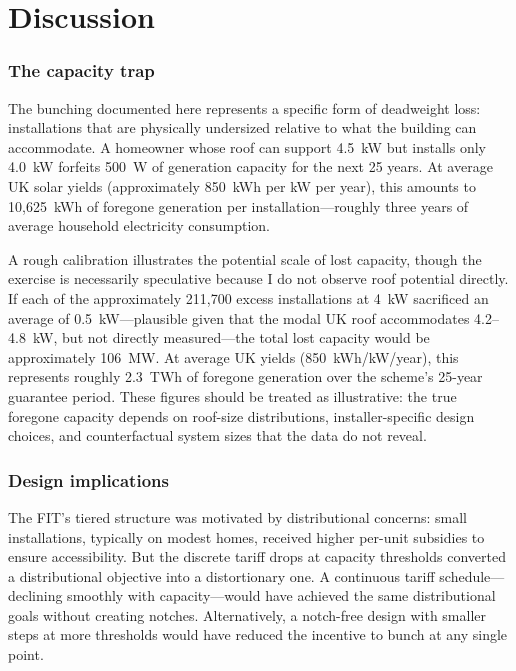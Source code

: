 \documentclass[12pt]{article}
\begin{document}
\section{Discussion}
\label{sec:discussion}

\subsubsection*{The capacity trap} The bunching documented here represents a specific form of deadweight loss: installations that are physically undersized relative to what the building can accommodate. A homeowner whose roof can support 4.5~kW but installs only 4.0~kW forfeits 500~W of generation capacity for the next 25 years. At average UK solar yields (approximately 850~kWh per kW per year), this amounts to 10,625~kWh of foregone generation per installation---roughly three years of average household electricity consumption.

A rough calibration illustrates the potential scale of lost capacity, though the exercise is necessarily speculative because I do not observe roof potential directly. If each of the approximately 211,700 excess installations at 4~kW sacrificed an average of 0.5~kW---plausible given that the modal UK roof accommodates 4.2--4.8~kW, but not directly measured---the total lost capacity would be approximately 106~MW. At average UK yields (850~kWh/kW/year), this represents roughly 2.3~TWh of foregone generation over the scheme's 25-year guarantee period. These figures should be treated as illustrative: the true foregone capacity depends on roof-size distributions, installer-specific design choices, and counterfactual system sizes that the data do not reveal.

\subsubsection*{Design implications} The FIT's tiered structure was motivated by distributional concerns: small installations, typically on modest homes, received higher per-unit subsidies to ensure accessibility. But the discrete tariff drops at capacity thresholds converted a distributional objective into a distortionary one. A continuous tariff schedule---declining smoothly with capacity---would have achieved the same distributional goals without creating notches. Alternatively, a notch-free design with smaller steps at more thresholds would have reduced the incentive to bunch at any single point.
\end{document}

